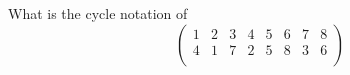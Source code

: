   What is the cycle notation of
  \[
  \begin{pmatrix}
    1 & 2 & 3 & 4 & 5 & 6 & 7 & 8\\
    4 & 1 & 7 & 2 & 5 & 8 & 3 & 6 \\
  \end{pmatrix}
  \]  

